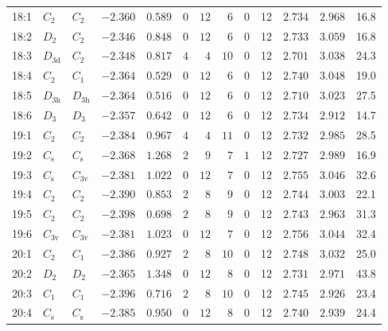 \begin{table}[htbp]
{\begin{tabular}{lllrrrrrrrrrr}
    18:1    & $C_\mathrm{2}$  & $C_\mathrm{2 }$ & $-2.360$ & $0.589$  & $0$ & $12$ & $6$  & $0$ & 12 & $2.734$ & $2.968$ & 16.8  \\
    18:2    & $D_\mathrm{2}$  & $C_\mathrm{2 }$ & $-2.346$ & $0.848$  & $0$ & $12$ & $6$  & $0$ & 12 & $2.733$ & $3.059$ & 16.8  \\
    18:3    & $D_\mathrm{3d}$ & $C_\mathrm{2 }$ & $-2.348$ & $0.817$  & $4$ & $4$  & $10$ & $0$ & 12 & $2.701$ & $3.038$ & 24.3  \\
    18:4    & $C_\mathrm{2}$  & $C_\mathrm{1 }$ & $-2.364$ & $0.529$  & $0$ & $12$ & $6$  & $0$ & 12 & $2.740$ & $3.048$ & 19.0  \\
    18:5    & $D_\mathrm{3h}$ & $D_\mathrm{3h}$ & $-2.364$ & $0.516$  & $0$ & $12$ & $6$  & $0$ & 12 & $2.710$ & $3.023$ & 27.5  \\
    18:6    & $D_\mathrm{3}$  & $D_\mathrm{3 }$ & $-2.357$ & $0.642$  & $0$ & $12$ & $6$  & $0$ & 12 & $2.734$ & $2.912$ & 14.7  \\
    19:1    & $C_\mathrm{2}$  & $C_\mathrm{2 }$ & $-2.384$ & $0.967$  & $4$ & $4$  & $11$ & $0$ & 12 & $2.732$ & $2.985$ & 28.5  \\
    19:2    & $C_\mathrm{s}$  & $C_\mathrm{s }$ & $-2.368$ & $1.268$  & $2$ & $9$  & $7$  & $1$ & 12 & $2.727$ & $2.989$ & 16.9  \\
    19:3    & $C_\mathrm{s}$  & $C_\mathrm{3v}$ & $-2.381$ & $1.022$  & $0$ & $12$ & $7$  & $0$ & 12 & $2.755$ & $3.046$ & 32.6  \\
    19:4    & $C_\mathrm{2}$  & $C_\mathrm{2 }$ & $-2.390$ & $0.853$  & $2$ & $8$  & $9$  & $0$ & 12 & $2.744$ & $3.003$ & 22.1  \\
    19:5    & $C_\mathrm{2}$  & $C_\mathrm{2 }$ & $-2.398$ & $0.698$  & $2$ & $8$  & $9$  & $0$ & 12 & $2.743$ & $2.963$ & 31.3  \\
    19:6    & $C_\mathrm{3v}$ & $C_\mathrm{3v}$ & $-2.381$ & $1.023$  & $0$ & $12$ & $7$  & $0$ & 12 & $2.756$ & $3.044$ & 32.4  \\
    20:1    & $C_\mathrm{2}$  & $C_\mathrm{1 }$ & $-2.386$ & $0.927$  & $2$ & $8$  & $10$ & $0$ & 12 & $2.748$ & $3.032$ & 25.0  \\
    20:2    & $D_\mathrm{2}$  & $D_\mathrm{2 }$ & $-2.365$ & $1.348$  & $0$ & $12$ & $8$  & $0$ & 12 & $2.731$ & $2.971$ & 43.8  \\
    20:3    & $C_\mathrm{1}$  & $C_\mathrm{1 }$ & $-2.396$ & $0.716$  & $2$ & $8$  & $10$ & $0$ & 12 & $2.745$ & $2.926$ & 23.4  \\
    20:4    & $C_\mathrm{s}$  & $C_\mathrm{s }$ & $-2.385$ & $0.950$  & $0$ & $12$ & $8$  & $0$ & 12 & $2.740$ & $2.939$ & 24.4  \\

\end{tabular}}
\end{table}
